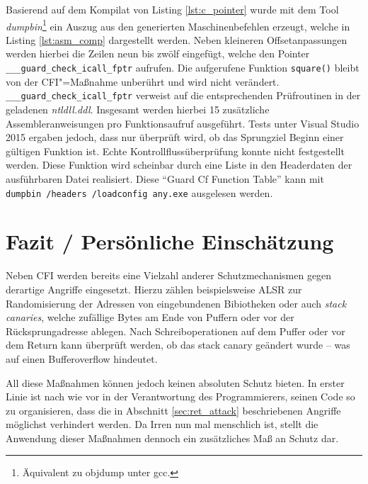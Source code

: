 Basierend auf dem Kompilat von Listing \ref{lst:c_pointer} wurde mit dem Tool \emph{dumpbin}\footnote{Äquivalent zu objdump unter gcc.} ein Auszug aus den generierten Maschinenbefehlen erzeugt, welche in Listing \ref{lst:asm_comp} dargestellt werden. Neben kleineren Offsetanpassungen werden hierbei die Zeilen neun bis zwölf eingefügt, welche den Pointer \texttt{___guard_check_icall_fptr} aufrufen. Die aufgerufene Funktion \texttt{square()} bleibt von der CFI"=Maßnahme unberührt und wird nicht verändert. \texttt{___guard_check_icall_fptr} verweist auf die entsprechenden Prüfroutinen in der geladenen \emph{ntldll.ddl}. Insgesamt werden hierbei 15 zusätzliche Assembleranweisungen pro Funktionsaufruf ausgeführt. Tests unter Visual Studio 2015 ergaben jedoch, dass nur überprüft wird, ob das Sprungziel Beginn einer gültigen Funktion ist. Echte Kontrollflussüberprüfung konnte nicht festgestellt werden. Diese Funktion wird scheinbar durch eine Liste in den Headerdaten der ausführbaren Datei realisiert. Diese \enquote{Guard Cf Function Table} kann mit \texttt{ dumpbin /headers /loadconfig any.exe} ausgelesen werden.

\section{Fazit / Persönliche Einschätzung}
Neben CFI werden bereits eine Vielzahl anderer Schutzmechanismen gegen derartige Angriffe eingesetzt. Hierzu zählen beispielsweise ALSR zur Randomisierung der Adressen von eingebundenen Bibiotheken oder auch \emph{stack canaries}, welche zufällige Bytes am Ende von Puffern oder vor der Rücksprungadresse ablegen. Nach Schreiboperationen auf dem Puffer oder vor dem Return kann überprüft werden, ob das stack canary geändert wurde -- was auf einen Bufferoverflow hindeutet.

All diese Maßnahmen können jedoch keinen absoluten Schutz bieten. In erster Linie ist nach wie vor in der Verantwortung des Programmierers, seinen Code so zu organisieren, dass die in Abschnitt \ref{sec:ret_attack} beschriebenen Angriffe möglichst verhindert werden. Da Irren nun mal menschlich ist, stellt die Anwendung dieser Maßnahmen dennoch ein zusätzliches Maß an Schutz dar.

\clearpage
\printbibliography

